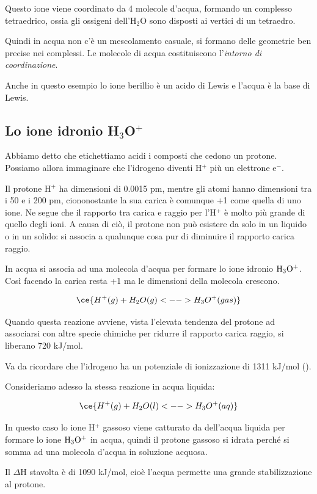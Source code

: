 Questo ione viene coordinato da 4 molecole d'acqua, formando un complesso tetraedrico, ossia gli ossigeni dell'H$_2$O sono disposti ai vertici di un tetraedro.

Quindi in acqua non c'è un mescolamento casuale, si formano delle geometrie ben precise nei complessi. Le molecole di acqua costituiscono l'\textit{intorno di coordinazione}.

Anche in questo esempio lo ione berillio è un acido di Lewis e l'acqua è la base di Lewis.

\subsection{Lo ione idronio H$_3$O$^+$}
Abbiamo detto che etichettiamo acidi i composti che cedono un protone. Possiamo allora immaginare che l'idrogeno diventi H$^+$ più un elettrone e$^-$.

Il protone H$^+$ ha dimensioni di 0.0015 pm, mentre gli atomi hanno dimensioni tra i 50 e i 200 pm, ciononostante la sua carica è comunque +1 come quella di uno ione. Ne segue che il rapporto tra carica e raggio per l'H$^+$ è molto più grande di quello degli ioni. A causa di ciò, il protone non può esistere da solo in un liquido o in un solido: si associa a qualunque cosa pur di diminuire il rapporto carica raggio.

In acqua si associa ad una molecola d'acqua per formare lo ione idronio $\rm H_3O^+$. Così facendo la carica resta +1 ma le dimensioni della molecola crescono.

$$\ce{H^+(g) + H_2O(g) <--> H_3O^+(gas)}$$

Quando questa reazione avviene, vista l'elevata tendenza del protone ad associarsi con altre specie chimiche per ridurre il rapporto carica raggio, si liberano 720 kJ/mol.

Va da ricordare che l'idrogeno ha un potenziale di ionizzazione di 1311 kJ/mol ().

\vspace{0.2cm}Consideriamo adesso la stessa reazione in acqua liquida:

$$\ce{H^+(g) + H_2O(l) <--> H_3O^+(aq)}$$

In questo caso lo ione H$^+$ gassoso viene catturato da dell'acqua liquida per formare lo ione $\rm H_3O^+$ in acqua, quindi il protone gassoso si idrata perché si somma ad una molecola d'acqua in soluzione acquosa.

Il $\Delta$H stavolta è di 1090 kJ/mol, cioè l'acqua permette una grande stabilizzazione al protone.

